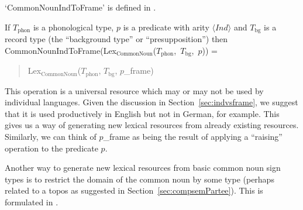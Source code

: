 `CommonNounIndToFrame' is defined in \nexteg{}.

\begin{ex}
If $T_{\mathrm{phon}}$ is a phonological type, $p$ is a predicate with
arity $\langle\textit{Ind}\rangle$ and
$T_\mathrm{bg}$ is a record type (the ``background type'' or
``presupposition'') then \\ 
\mbox{CommonNounIndToFrame(Lex$_{\mathrm{CommonNoun}}$($T_{\mathrm{phon}}$,
  $T_\mathrm{bg}$, $p$))} =
\begin{quote}
  Lex$_{\mathrm{CommonNoun}}$($T_{\mathrm{phon}}$,
  $T_\mathrm{bg}$, $p$\_frame)
\end{quote}

\label{ex:CommonNounIndToFrame} 
\end{ex} 
This operation is a universal resource which may or may not be used by
individual languages.  Given the discussion in
Section~\ref{sec:indvsframe}, we suggest that it is used productively
in English but not in German, for example.  This gives us a way of
generating new lexical resources from already existing resources.
Similarly, we can think of $p$\_frame as being the result of applying
a ``raising'' operation to the predicate $p$. %

Another way to generate new lexical resources from basic common noun
sign types is to restrict the domain of the common noun by some type
(perhaps related to a topos as suggested in
Section~\ref{sec:compsemPartee}).  This is formulated in \nexteg{}.


